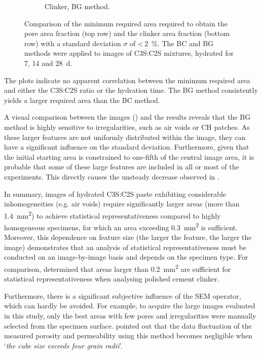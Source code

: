 \begin{figure}[htb]
\begin{subfigure}[b]{0.49\textwidth}
        \caption{
            Clinker, \ac{BG} method.
        }
        \label{fig:areagrowth_clinker}
    \end{subfigure}
    \caption{
        Comparison of the minimum required area required to obtain the pore area fraction (top row) and the clinker area fraction (bottom row) with a standard deviation $\sigma$ of <\,\qty{2}{\percent}.
        The \ac{BC} and \ac{BG} methods were applied to images of \ac{C3S}:\ac{C2S} mixtures, hydrated for \num{7}, \num{14} and \qty{28}{\day}.
    }
    \label{fig:box_statistics_clinker}
\end{figure}

The plots indicate no apparent correlation between the minimum required area and either the \ac{C3S}:\ac{C2S} ratio or the hydration time.
The \ac{BG} method consistently yields a larger required area than the \ac{BC} method.

A visual comparison between the images () and the results reveals that the \ac{BG} method is highly sensitive to irregularities, such as air voids or \ac{CH} patches.
As these larger features are not uniformly distributed within the image, they can have a significant influence on the standard deviation.
Furthermore, given that the initial starting area is constrained to one-fifth of the central image area, it is probable that some of these large features are included in all or most of the experiments.
This directly causes the unsteady decrease observed in .

In summary, images of hydrated \ac{C3S}:\ac{C2S} paste exhibiting considerable inhomogeneities (e.g. air voids) require significantly larger areas (more than \qty{1.4}{\milli\meter\squared}) to achieve statistical representativeness compared to highly homogeneous specimens, for which an area exceeding \qty{0.3}{\milli\meter\squared} is sufficient.
Moreover, this dependence on feature size (the larger the feature, the larger the image) demonstrates that an analysis of statistical representativeness must be conducted on an image-by-image basis and depends on the specimen type.
For comparison, \textcite{stutzman.2004} determined that areas larger than \qty{0.2}{\milli\meter\squared} are sufficient for statistical representativeness when analysing polished cement clinker.

Furthermore, there is a significant subjective influence of the \ac{SEM} operator, which can hardly be avoided.
For example, to acquire the large images evaluated in this study, only the best areas with few pores and irregularities were manually selected from the specimen surface.
\textcite{kameda.2006} pointed out that the data fluctuation of the measured porosity and permeability using this method becomes negligible when `\textit{the cube size exceeds four grain radii}'.
